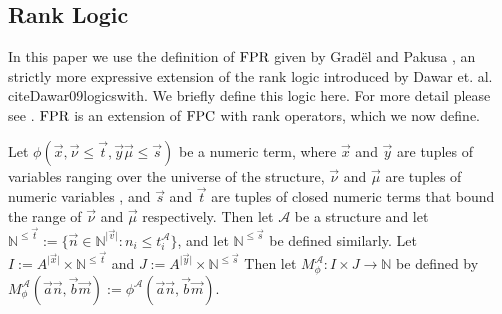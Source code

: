\documentclass[../paper.tex]{subfiles}
\begin{document}


\subsection{Rank Logic}
In this paper we use the definition of $\text{\upshape FPR}$ given by Grad\"{e}l and Pakusa
\cite{Gradel2015}, an strictly more expressive extension of the rank logic
introduced by Dawar et. al. cite{Dawar09logicswith}. We briefly define this
logic here. For more detail please see \cite{Gradel2015}. $\text{\upshape FPR}$ is an extension
of $\text{\upshape FPC}$ with rank operators, which we now define.

Let $\phi (\vec{x}, \vec {\nu} \leq \vec{t}, \vec{y}\vec{\mu} \leq \vec{s})$ be
a numeric term, where $\vec{x}$ and $\vec{y}$ are tuples of variables ranging
over the universe of the structure, $\vec{\nu}$ and $\vec{\mu}$ are tuples of
numeric variables , and $\vec{s}$ and $\vec{t}$ are tuples of closed numeric
terms that bound the range of $\vec{\nu}$ and $\vec{\mu}$ respectively. Then let
$\mathcal{A}$ be a structure and let $\mathbb{N}^{\leq\vec{t}} := \{\vec{n} \in
\mathbb{N}^{\vert \vec{v} \vert}: n_i \leq t^{\mathcal{A}}_i\}$, and let
$\mathbb{N}^{\leq \vec{s}}$ be defined similarly. Let $I:= A^{\vert \vec{x}
  \vert} \times \mathbb{N}^{\leq \vec{t}}$ and $J := A^{\vert \vec{y} \vert}
\times \mathbb{N}^{\leq \vec{s}}$ Then let $M^{\mathcal{A}}_\phi : I \times J
\rightarrow \mathbb{N}$ be defined by $M^{\mathcal{A}}_\phi (\vec{a}\vec{n},
\vec{b}\vec{m}):= \phi^{\mathcal{A}}(\vec{a}\vec{n},\vec{b}\vec{m})$.
\end{document}
